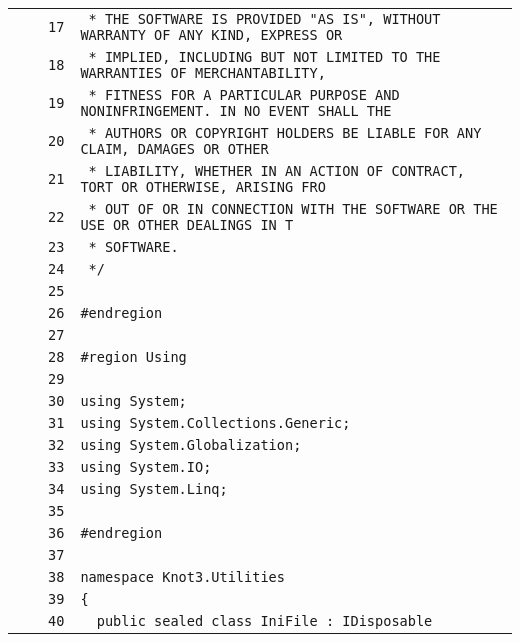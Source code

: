 \documentclass[a4paper,10pt]{article}
\begin{document}
\begin{longtable}[l]{lrrl}
\cellcolor{gray} &  & \verb~17~ & \verb~ * THE SOFTWARE IS PROVIDED "AS IS", WITHOUT WARRANTY OF ANY KIND, EXPRESS OR~\\
\cellcolor{gray} &  & \verb~18~ & \verb~ * IMPLIED, INCLUDING BUT NOT LIMITED TO THE WARRANTIES OF MERCHANTABILITY,~\\
\cellcolor{gray} &  & \verb~19~ & \verb~ * FITNESS FOR A PARTICULAR PURPOSE AND NONINFRINGEMENT. IN NO EVENT SHALL THE~\\
\cellcolor{gray} &  & \verb~20~ & \verb~ * AUTHORS OR COPYRIGHT HOLDERS BE LIABLE FOR ANY CLAIM, DAMAGES OR OTHER~\\
\cellcolor{gray} &  & \verb~21~ & \verb~ * LIABILITY, WHETHER IN AN ACTION OF CONTRACT, TORT OR OTHERWISE, ARISING FRO~\\
\cellcolor{gray} &  & \verb~22~ & \verb~ * OUT OF OR IN CONNECTION WITH THE SOFTWARE OR THE USE OR OTHER DEALINGS IN T~\\
\cellcolor{gray} &  & \verb~23~ & \verb~ * SOFTWARE.~\\
\cellcolor{gray} &  & \verb~24~ & \verb~ */~\\
\cellcolor{gray} &  & \verb~25~ & \verb~~\\
\cellcolor{gray} &  & \verb~26~ & \verb~#endregion~\\
\cellcolor{gray} &  & \verb~27~ & \verb~~\\
\cellcolor{gray} &  & \verb~28~ & \verb~#region Using~\\
\cellcolor{gray} &  & \verb~29~ & \verb~~\\
\cellcolor{gray} &  & \verb~30~ & \verb~using System;~\\
\cellcolor{gray} &  & \verb~31~ & \verb~using System.Collections.Generic;~\\
\cellcolor{gray} &  & \verb~32~ & \verb~using System.Globalization;~\\
\cellcolor{gray} &  & \verb~33~ & \verb~using System.IO;~\\
\cellcolor{gray} &  & \verb~34~ & \verb~using System.Linq;~\\
\cellcolor{gray} &  & \verb~35~ & \verb~~\\
\cellcolor{gray} &  & \verb~36~ & \verb~#endregion~\\
\cellcolor{gray} &  & \verb~37~ & \verb~~\\
\cellcolor{gray} &  & \verb~38~ & \verb~namespace Knot3.Utilities~\\
\cellcolor{gray} &  & \verb~39~ & \verb~{~\\
\cellcolor{gray} &  & \verb~40~ & \verb~  public sealed class IniFile : IDisposable~\\

\end{longtable}
\end{document}
